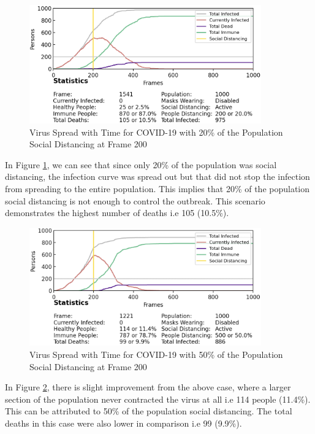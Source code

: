 \documentclass[11pt]{article}
\begin{document}
\begin{enumerate}
    \begin{figure}[H]
    \centering
    \includegraphics[width=10cm]{figures/social_distancing_20percent.png}
    \caption{Virus Spread with Time for COVID-19 with 20\% of the Population Social Distancing at Frame 200}
    \label{social_distancing_20percent}
\end{figure}

In Figure \ref{social_distancing_20percent}, we can see that since only 20\% of the population was social distancing, the infection curve was spread out but that did not stop the infection from spreading to the entire population. This implies that 20\% of the population social distancing is not enough to control the outbreak. This scenario demonstrates the highest number of deaths i.e 105 (10.5\%).

\begin{figure}[H]
    \centering
    \includegraphics[width=10cm]{figures/social_distancing_50percent.png}
    \caption{Virus Spread with Time for COVID-19 with 50\% of the Population Social Distancing at Frame 200}
    \label{social_distancing_50percent}
\end{figure}

In Figure \ref{social_distancing_50percent}, there is slight improvement from the above case, where a larger section of the population never contracted the virus at all i.e 114 people (11.4\%). This can be attributed to 50\% of the population social distancing. The total deaths in this case were also lower in comparison i.e 99 (9.9\%). 


\end{enumerate}
\end{document}
